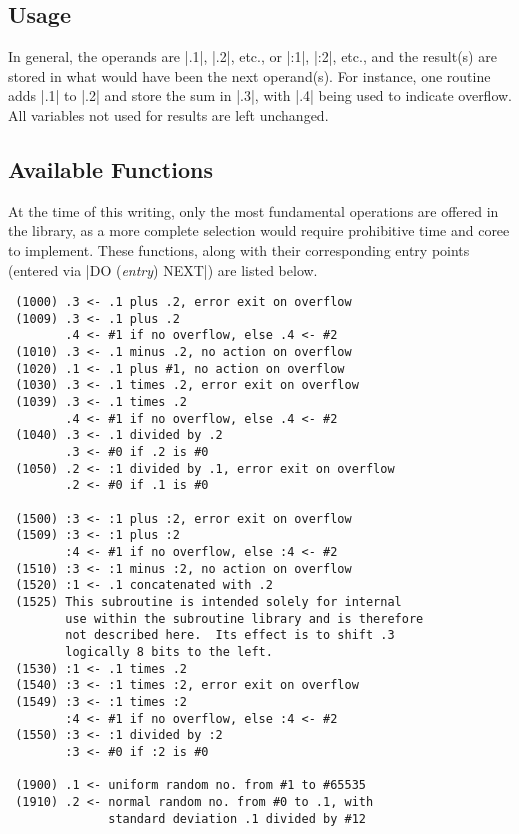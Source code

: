 \subsection{Usage}

In general, the operands are |.1|, |.2|, etc., or |:1|, |:2|, etc., and the
result(s) are stored in what would have been the next operand(s).  For
instance, one routine adds |.1| to |.2| and store the sum in |.3|, with
|.4| being used to indicate overflow.  All variables not used for results
are left unchanged.

\subsection{Available Functions}

At the time of this writing, only the most fundamental operations are
offered in the library, as a more complete selection would require
prohibitive time and coree to implement.  These functions, along with their
corresponding entry points (entered via |DO ({\em entry}) NEXT|) are listed
below.

\begin{verbatim}
 (1000) .3 <- .1 plus .2, error exit on overflow
 (1009) .3 <- .1 plus .2
        .4 <- #1 if no overflow, else .4 <- #2
 (1010) .3 <- .1 minus .2, no action on overflow
 (1020) .1 <- .1 plus #1, no action on overflow
 (1030) .3 <- .1 times .2, error exit on overflow
 (1039) .3 <- .1 times .2
        .4 <- #1 if no overflow, else .4 <- #2
 (1040) .3 <- .1 divided by .2
        .3 <- #0 if .2 is #0
 (1050) .2 <- :1 divided by .1, error exit on overflow
        .2 <- #0 if .1 is #0

 (1500) :3 <- :1 plus :2, error exit on overflow
 (1509) :3 <- :1 plus :2
        :4 <- #1 if no overflow, else :4 <- #2
 (1510) :3 <- :1 minus :2, no action on overflow
 (1520) :1 <- .1 concatenated with .2
 (1525) This subroutine is intended solely for internal
        use within the subroutine library and is therefore
        not described here.  Its effect is to shift .3
        logically 8 bits to the left.
 (1530) :1 <- .1 times .2
 (1540) :3 <- :1 times :2, error exit on overflow
 (1549) :3 <- :1 times :2
        :4 <- #1 if no overflow, else :4 <- #2
 (1550) :3 <- :1 divided by :2
        :3 <- #0 if :2 is #0

 (1900) .1 <- uniform random no. from #1 to #65535
 (1910) .2 <- normal random no. from #0 to .1, with
              standard deviation .1 divided by #12
\end{verbatim}

